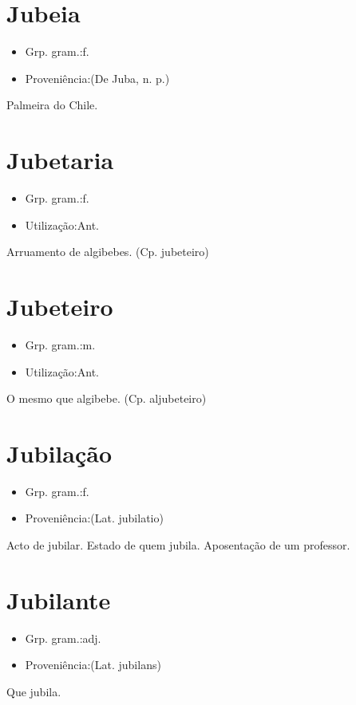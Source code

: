 \documentclass{article}
\begin{document}
\section{Jubeia}
\begin{itemize}
\item {Grp. gram.:f.}
\end{itemize}
\begin{itemize}
\item {Proveniência:(De \textunderscore Juba\textunderscore , n. p.)}
\end{itemize}
Palmeira do Chile.
\section{Jubetaria}
\begin{itemize}
\item {Grp. gram.:f.}
\end{itemize}
\begin{itemize}
\item {Utilização:Ant.}
\end{itemize}
Arruamento de algibebes.
(Cp. \textunderscore jubeteiro\textunderscore )
\section{Jubeteiro}
\begin{itemize}
\item {Grp. gram.:m.}
\end{itemize}
\begin{itemize}
\item {Utilização:Ant.}
\end{itemize}
O mesmo que \textunderscore algibebe\textunderscore .
(Cp. \textunderscore aljubeteiro\textunderscore )
\section{Jubilação}
\begin{itemize}
\item {Grp. gram.:f.}
\end{itemize}
\begin{itemize}
\item {Proveniência:(Lat. \textunderscore jubilatio\textunderscore )}
\end{itemize}
Acto de jubilar.
Estado de quem jubila.
Aposentação de um professor.
\section{Jubilante}
\begin{itemize}
\item {Grp. gram.:adj.}
\end{itemize}
\begin{itemize}
\item {Proveniência:(Lat. \textunderscore jubilans\textunderscore )}
\end{itemize}
Que jubila.
\end{document}
